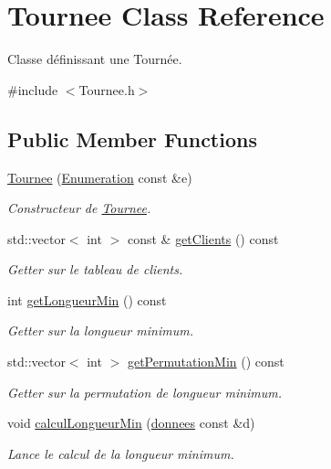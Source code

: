 \hypertarget{classTournee}{\section{\-Tournee \-Class \-Reference}
\label{classTournee}
}


\-Classe définissant une \-Tournée.  




{\ttfamily \#include $<$\-Tournee.\-h$>$}

\subsection*{\-Public \-Member \-Functions}
\begin{DoxyCompactItemize}
\item 
\hyperlink{classTournee_af4f72da48391abc5fc4cc9eba6cd6124}{\-Tournee} (\hyperlink{classEnumeration}{\-Enumeration} const \&e)
\begin{DoxyCompactList}\small\item\em \-Constructeur de \hyperlink{classTournee}{\-Tournee}. \end{DoxyCompactList}\item 
std\-::vector$<$ int $>$ const \& \hyperlink{classTournee_a8c21db87b8687bec38f80fc717e2d339}{get\-Clients} () const 
\begin{DoxyCompactList}\small\item\em \-Getter sur le tableau de clients. \end{DoxyCompactList}\item 
int \hyperlink{classTournee_aa38cf85d8db411f81f6701689bc92d4d}{get\-Longueur\-Min} () const 
\begin{DoxyCompactList}\small\item\em \-Getter sur la longueur minimum. \end{DoxyCompactList}\item 
std\-::vector$<$ int $>$ \hyperlink{classTournee_a33033e529206f69ed769c20c28f323b3}{get\-Permutation\-Min} () const 
\begin{DoxyCompactList}\small\item\em \-Getter sur la permutation de longueur minimum. \end{DoxyCompactList}\item 
void \hyperlink{classTournee_a7dd3fc6a8929685a9c3fbeb1bfb70614}{calcul\-Longueur\-Min} (\hyperlink{structdonnees}{donnees} const \&d)
\begin{DoxyCompactList}\small\item\em \-Lance le calcul de la longueur minimum. \end{DoxyCompactList}\end{DoxyCompactItemize}
